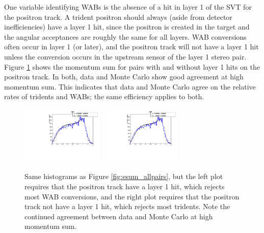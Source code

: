 One variable identifying WABs is the absence of a hit in layer 1 of the SVT for the positron track.
A trident positron should always (aside from detector inefficiencies) have a layer 1 hit, since the positron is created in the target and the angular acceptances are roughly the same for all layers.
WAB conversions often occur in layer 1 (or later), and the positron track will not have a layer 1 hit unless the conversion occurs in the upstream sensor of the layer 1 stereo pair.
Figure \ref{fig:esum_l1pos} shows the momentum sum for pairs with and without layer 1 hits on the positron track.
In both, data and Monte Carlo show good agreement at high momentum sum.
This indicates that data and Monte Carlo agree on the relative rates of tridents and WABs; the same efficiency applies to both.

\begin{figure}[ht]
\begin{center}
    \includegraphics[width=0.35\textwidth,page=38,angle=-90]{recon/figs/wabratioplots}
    \includegraphics[width=0.35\textwidth,page=40,angle=-90]{recon/figs/wabratioplots}
\end{center}
    \caption{Same histograms as Figure \ref{fig:esum_allpairs}, but the left plot requires that the positron track have a layer 1 hit, which rejects most WAB conversions, and the right plot requires that the positron track not have a layer 1 hit, which rejects most tridents.
    Note the continued agreement between data and Monte Carlo at high momentum sum.
    }
    \label{fig:esum_l1pos}
\end{figure}

